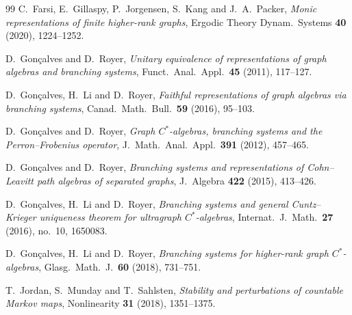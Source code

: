 \documentclass[12pt, reqno]{amsart}
\theoremstyle{definition}
\theoremstyle{remark}
\numberwithin{equation}{section}
\begin{document}
\begin{thebibliography}{99}
C.\ Farsi, E.\ Gillaspy, P.\ Jorgensen, S.\ Kang and J.\ A.\ Packer,
\textit{Monic representations of finite higher-rank graphs},
Ergodic Theory Dynam.\ Systems \textbf{40} (2020), 1224--1252.





D.\ Gon\c{c}alves and D.\ Royer,
\textit{Unitary equivalence of representations of graph algebras and branching systems},
Funct.\ Anal.\ Appl.\ \textbf{45} (2011), 117--127.

D.\ Gon\c{c}alves, H.\ Li and D.\ Royer,
\textit{Faithful representations of graph algebras via branching systems},
Canad.\ Math.\ Bull.\ \textbf{59} (2016), 95--103.

D.\ Gon\c{c}alves and D.\ Royer,
\textit{Graph $C^*$-algebras, branching systems and the Perron--Frobenius operator},
J.\ Math.\ Anal.\ Appl.\ \textbf{391} (2012), 457--465.

D.\ Gon\c{c}alves and D.\ Royer,
\textit{Branching systems and representations of Cohn--Leavitt path algebras of separated graphs},
J.\ Algebra \textbf{422} (2015), 413--426.

D.\ Gon\c{c}alves, H.\ Li and D.\ Royer,
\textit{Branching systems and general Cuntz--Krieger uniqueness theorem for ultragraph $C^*$-algebras},
Internat.\ J.\ Math.\ \textbf{27} (2016), no.\ 10, 1650083.

D.\ Gon\c{c}alves, H.\ Li and D.\ Royer,
\textit{Branching systems for higher-rank graph $C^*$-algebras},
Glasg.\ Math.\ J.\ \textbf{60} (2018), 731--751.

T.\ Jordan, S.\ Munday and T.\ Sahlsten,
\textit{Stability and perturbations of countable Markov maps},
Nonlinearity \textbf{31} (2018), 1351--1375.


\end{thebibliography}
\end{document}
